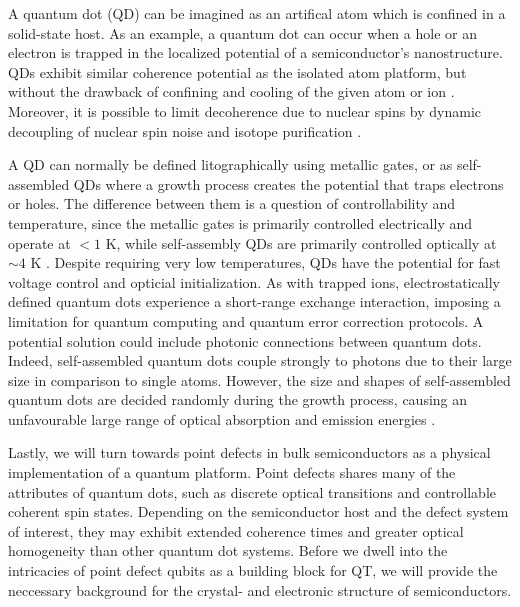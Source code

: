 A quantum dot (QD) can be imagined as an artifical atom which is confined in a solid-state host. As an example, a quantum dot can occur when a hole or an electron is trapped in the localized potential of a semiconductor's nanostructure. QDs exhibit similar coherence potential as the isolated atom platform, but without the drawback of confining and cooling of the given atom or ion \cite{Acin2018}. Moreover, it is possible to limit decoherence due to nuclear spins by dynamic decoupling of nuclear spin noise and isotope purification \cite{Ladd2010}.

A QD can normally be defined litographically using metallic gates, or as self-assembled QDs where a growth process creates the potential that traps electrons or holes. The difference between them is a question of controllability and temperature, since the metallic gates is primarily controlled electrically and operate at $<1$ K, while self-assembly QDs are primarily controlled optically at $\sim 4$ K \cite{Ladd2010}. Despite requiring very low temperatures, QDs have the potential for fast voltage control and opticial initialization. As with trapped ions, electrostatically defined quantum dots experience a short-range exchange interaction, imposing a limitation for quantum computing and quantum error correction protocols. A potential solution could include photonic connections between quantum dots. Indeed, self-assembled quantum dots couple strongly to photons due to their large size in comparison to single atoms. However, the size and shapes of self-assembled quantum dots are decided randomly during the growth process, causing an unfavourable large range of optical absorption and emission energies \cite{Ladd2010}.




Lastly, we will turn towards point defects in bulk semiconductors as a physical implementation of a quantum platform. Point defects shares many of the attributes of quantum dots, such as discrete optical transitions and controllable coherent spin states. %
Depending on the semiconductor host and the defect system of interest, they may exhibit extended coherence times and greater optical homogeneity than other quantum dot systems. Before we dwell into the intricacies of point defect qubits as a building block for QT, we will provide the neccessary background for the crystal- and electronic structure of semiconductors.   %

